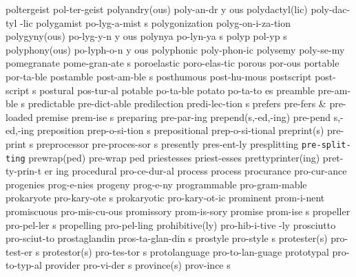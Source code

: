 \1 poltergeist		pol-ter-geist
\3 polyandry(ous)	poly-an-dr y ous	%
\2 polydactyl(lic)	poly-dac-tyl -lic	%
\5 polygamist		po-lyg-a-mist s
\1 polygonization	polyg-on-i-za-tion
\3 polygyny(ous)	po-lyg-y-n y ous	%
\NewWordtrue
\5 polynya		po-lyn-ya s		%
\5 polyp		pol-yp s
\3 polyphony(ous)	po-lyph-o-n y ous
\1 polyphonic		poly-phon-ic		%
\NewWordtrue
\1 polysemy		poly-se-my		%
\5 pomegranate		pome-gran-ate s
\1 poroelastic		poro-elas-tic
\1 porous		por-ous
\1 portable		por-ta-ble		%
\5 postamble		post-am-ble s
\1 posthumous		post-hu-mous	%
\5 postscript		post-script s
\1 postural		pos-tur-al
\NewWordtrue
\1 potable		po-ta-ble		%
\NewWordtrue
\5 potato		po-ta-to es		%
\5 preamble		pre-am-ble s
\1 predictable		pre-dict-able		%
\NewWordtrue
\5 predilection		predi-lec-tion s	%
\1 prefers		pre-fers		%
 & pre-loaded \cr
\NewWordtrue
\5 premise		prem-ise s		%
\1 preparing		pre-par-ing
\NewWordtrue
\2 prepend(s,-ed,-ing)	pre-pend s,-ed,-ing 	%
\NewWordtrue
\5 preposition		prep-o-si-tion s 	%
\NewWordtrue
\1 prepositional	prep-o-si-tional	%
\2 preprint(s)		pre-print s
\5 preprocessor		pre-proces-sor s
\1 presently		pres-ent-ly		%
\1 presplitting 	{\tt\bs pre-split-ting}
\2 prewrap(ped)		pre-wrap ped		%
\1 priestesses		priest-esses
\3 prettyprinter(ing)	pret-ty-prin-t er ing
\1 procedural		pro-ce-dur-al
\1 process		process\thinspace*
\1 procurance		pro-cur-ance
\1 progenies		prog-e-nies
\1 progeny		prog-e-ny
\1 programmable		pro-gram-mable		%
\5 prokaryote		pro-kary-ote s 		%
\1 prokaryotic		pro-kary-ot-ic		%
\1 prominent		prom-i-nent		%
\1 promiscuous		pro-mis-cu-ous		%
\1 promissory		prom-is-sory		%
\5 promise		prom-ise s		%
\5 propeller		pro-pel-ler s		%
\1 propelling		pro-pel-ling		%
\2 prohibitive(ly)	pro-hib-i-tive -ly
\1 prosciutto		pro-sciut-to
\5 prostaglandin	pros-ta-glan-din s 	%
\5 prostyle		pro-style s		%
\2 protester(s)		pro-test-er s
\2 protestor(s)		pro-tes-tor s
\1 protolanguage	pro-to-lan-guage     %
\1 prototypal		pro-to-typ-al
\NewWordtrue
\5 provider		pro-vi-der s		%
\2 province(s)		prov-ince s		%

